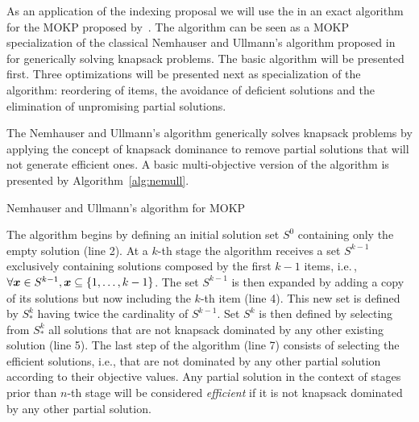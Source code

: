 
As an application of the indexing proposal we will use the \kdtree{}
in an exact algorithm for the MOKP proposed by~\cite{bazgan2009}.
The algorithm can be seen as a MOKP specialization of the classical
Nemhauser and Ullmann's algorithm proposed in~\cite{nemhauser1969discrete}
for generically solving knapsack problems.
The basic algorithm will be presented first.
Three optimizations will be presented next
as specialization of the algorithm: reordering of items,
the avoidance of deficient solutions and
the elimination of unpromising partial solutions.


The Nemhauser and Ullmann's algorithm generically solves knapsack problems
by applying the concept of knapsack dominance to remove partial solutions that will
not generate efficient ones.
A basic multi-objective version of the algorithm is presented by Algorithm~\ref{alg:nemull}.

\begin{algorithm}
  \caption{Nemhauser and Ullmann's algorithm for MOKP}
  \label{alg:nemull}
  
\end{algorithm}

The algorithm begins by defining an initial solution set $S^0$ containing only
the empty solution (line 2).
At a $k$-th stage the algorithm receives a set $S^{k-1}$
exclusively containing solutions composed by the first ${k-1}$ items, i.e.\,,
$\forall\boldsymbol{x} \in S^{k-1}, \boldsymbol{x} \subseteq \{1, \ldots, k-1\}$.
The set $S^{k-1}$ is then expanded by adding a copy of its solutions
but now including the $k$-th item (line 4).
This new set is defined by $S^k_*$ having twice the cardinality of $S^{k-1}$.
Set $S^k$ is then defined by selecting from $S^k_*$ all solutions
that are not knapsack dominated by any other existing solution (line 5).
The last step of the algorithm (line 7) consists of selecting the
efficient solutions, i.e., that are not dominated by any other partial solution
according to their objective values.
Any partial solution in the context of stages prior than $n$-th stage
will be considered \emph{efficient} if it is not knapsack dominated by any other
partial solution.

